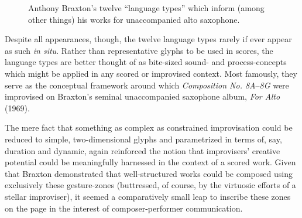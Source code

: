     \begin{figure}
        \centering
        \captionsetup{width=.45\textwidth}
        \caption[Anthony Braxton's twelve ``language types'' which inform (among other things) his works for unaccompanied alto saxophone.]{Anthony Braxton's twelve ``language types'' which inform (among other things) his works for unaccompanied alto saxophone.\footnotemark}
        \label{fig:language_types}
    \end{figure}

    \noindent Despite all appearances, though, the twelve language types rarely if ever appear as such \textit{in situ}. Rather than representative glyphs to be used in scores, the language types are better thought of as bite-sized sound- and process-concepts which might be applied in any scored or improvised context. Most famously, they serve as the conceptual framework around which \textit{Composition No. 8A}--\textit{8G} were improvised on Braxton's seminal unaccompanied saxophone album, \textit{For Alto} (1969).\autocite[118-49]{Braxton_1988A} 
    
    The mere fact that something as complex as constrained improvisation could be reduced to simple, two-dimensional glyphs and parametrized in terms of, say, duration and dynamic, again reinforced the notion that improvisers' creative potential could be meaningfully harnessed in the context of a scored work. Given that Braxton demonstrated that well-structured works could be composed using exclusively these gesture-zones (buttressed, of course, by the virtuosic efforts of a stellar improviser), it seemed a comparatively small leap to inscribe these zones on the page in the interest of composer-performer communication.

